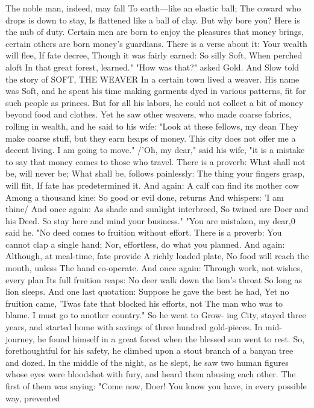 \documentclass{book}
\begin{document}
The noble man, indeed, may fall
To earth---like an elastic ball;
The coward who drops is down to stay,
Is flattened like a ball of clay.
But why bore you? Here is the nub of duty. Certain
men are born to enjoy the pleasures that money
brings, certain others are born money's guardians.
There is a verse about it:
Your wealth will flee,
If fate decree,
Though it was fairly earned:
So silly Soft,
When perched aloft
In that great forest, learned."
"How was that?" asked Gold. And Slow told the
story of
SOFT, THE WEAVER
In a certain town lived a weaver. His name was
Soft, and he spent his time making garments dyed
in various patterns, fit for such people as princes. But
for all his labors, he could not collect a bit of money
beyond food and clothes. Yet he saw other weavers,
who made coarse fabrics, rolling in wealth, and he
said to his wife: "Look at these fellows, my dean
They make coarse stuff, but they earn heaps of
money. This city does not offer me a decent living.
I am going to move."
/'Oh, my dear," said his wife, "it is a mistake to
say that money comes to those who travel. There is
a proverb:
What shall not be, will never be;
What shall be, follows painlessly:
The thing your fingers grasp, will flit,
If fate has predetermined it.
And again:
A calf can find its mother cow
Among a thousand kine:
So good or evil done, returns
And whispers: 'I am thine/
And once again:
As shade and sunlight interbreed,
So twined are Doer and his Deed.
So stay here and mind your business."
"You are mistaken, my dear,0 said he. "No deed
comes to fruition without effort. There is a proverb:
You cannot clap a single hand;
Nor, effortless, do what you planned.
And again:
Although, at meal-time, fate provide
A richly loaded plate,
No food will reach the mouth, unless
The hand co-operate.
And once again:
Through work, not wishes, every plan
Its full fruition reaps:
No deer walk down the lion's throat
So long as lion sleeps.
And one last quotation:
Suppose he gave the best he had,
Yet no fruition came,
'Twas fate that blocked his efforts, not
The man who was to blame.
I must go to another country." So he went to Grow-
ing City, stayed three years, and started home with
savings of three hundred gold-pieces.
In mid-journey, he found himself in a great forest
when the blessed sun went to rest. So, forethoughtful
for his safety, he climbed upon a stout branch of a
banyan tree and dozed. In the middle of the night, as
he slept, he saw two human figures whose eyes were
bloodshot with fury, and heard them abusing each
other.
The first of them was saying: "Come now, Doer!
You know you have, in every possible way, prevented
\end{document}
